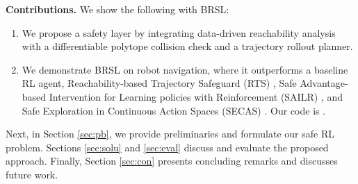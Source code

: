 \textbf{Contributions.}
We show the following with BRSL:
\begin{enumerate}[leftmargin=15pt,noitemsep,partopsep=0pt,topsep=0pt,parsep=0pt]
\itemsep0em
    
    \item We propose a safety layer by integrating data-driven reachability analysis with a differentiable polytope collision check and a trajectory rollout planner.
    
    \item We demonstrate BRSL on robot navigation, where it outperforms a baseline RL agent, Reachability-based Trajectory Safeguard (RTS) \cite{conf:modelBasedReachRL}, Safe Advantage-based Intervention for Learning policies with Reinforcement (SAILR) \cite{wagener2021safe}, and Safe Exploration in Continuous Action Spaces (SECAS) \cite{dalal2018safe}.
    Our code is \href{https://github.com/Mahmoud-Selim/Safe-Reinforcement-Learning-for-Black-Box-Systems-Using-Reachability-Analysis}{\underline{\color{blue}{online}}}.
\end{enumerate}

Next, in Section \ref{sec:pb}, we provide preliminaries and formulate our safe RL problem. 
Sections \ref{sec:solu} and \ref{sec:eval} discuss and evaluate the proposed approach.
Finally, Section \ref{sec:con} presents concluding remarks and discusses future work.




